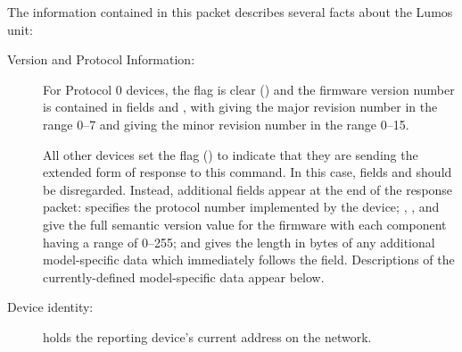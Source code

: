 \documentclass[letterpaper,twoside,onecolumn,openright,final]{memoir}
\begin{document}
The information contained in this packet describes several facts about the Lumos unit:
\begin{description}
	\item[Version and Protocol Information:]
		{\color{red}For Protocol 0 devices, the  flag is clear () and the
		firmware version number is contained in fields  and ,
		with  giving the major revision number in the range 0--7 and
		 giving the minor revision number in the range 0--15.}

		All other devices set the  flag () to indicate that they are sending
		the extended form of response to this command. In this case, fields  and
		 should be disregarded. Instead, additional fields appear at the end of
		the response packet:
		 specifies the protocol number implemented by the device;
		, , and  give the full semantic version value
		for the firmware with each component having a range of 0--255; and 
		gives the length in bytes of any additional model-specific data which immediately
		follows the  field.
		Descriptions of the currently-defined model-specific data appear below.
	\item[Device identity:]
		 holds the reporting device's current address on the network.


\end{description}
\end{document}
